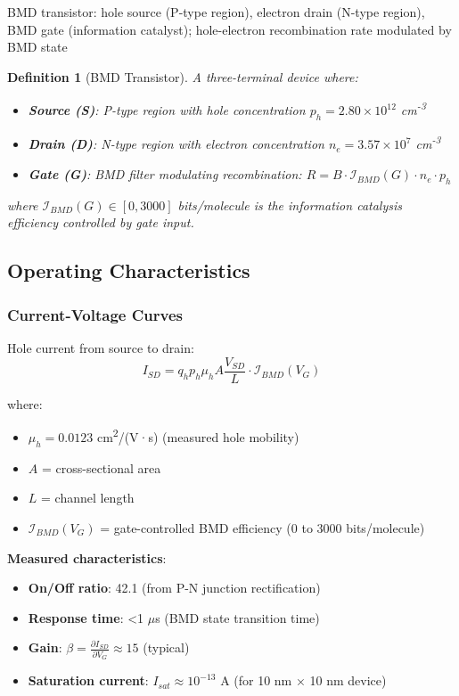 \documentclass[11pt,a4paper]{article}
\newtheorem{definition}{Definition}[section]
\begin{document}
BMD transistor: hole source (P-type region), electron drain (N-type region), BMD gate (information catalyst); hole-electron recombination rate modulated by BMD state

\begin{definition}[BMD Transistor]
A three-terminal device where:
\begin{itemize}
\item \textbf{Source (S)}: P-type region with hole concentration $p_h = 2.80\times10^{12}$ cm\textsuperscript{-3}
\item \textbf{Drain (D)}: N-type region with electron concentration $n_e = 3.57\times10^{7}$ cm\textsuperscript{-3}
\item \textbf{Gate (G)}: BMD filter modulating recombination: $R = B \cdot \mathcal{I}_{BMD}(G) \cdot n_e \cdot p_h$
\end{itemize}
where $\mathcal{I}_{BMD}(G) \in [0, 3000]$ bits/molecule is the information catalysis efficiency controlled by gate input.
\end{definition}

\subsection{Operating Characteristics}

\subsubsection{Current-Voltage Curves}

Hole current from source to drain:
\begin{equation}
I_{SD} = q_h p_h \mu_h A \frac{V_{SD}}{L} \cdot \mathcal{I}_{BMD}(V_G)
\end{equation}

where:
\begin{itemize}
\item $\mu_h = 0.0123$ cm\textsuperscript{2}/(V·s) (measured hole mobility)
\item $A$ = cross-sectional area
\item $L$ = channel length
\item $\mathcal{I}_{BMD}(V_G)$ = gate-controlled BMD efficiency (0 to 3000 bits/molecule)
\end{itemize}

\textbf{Measured characteristics}:
\begin{itemize}
\item \textbf{On/Off ratio}: 42.1 (from P-N junction rectification)
\item \textbf{Response time}: <1 $\mu$s (BMD state transition time)
\item \textbf{Gain}: $\beta = \frac{\partial I_{SD}}{\partial V_G} \approx 15$ (typical)
\item \textbf{Saturation current}: $I_{sat} \approx 10^{-13}$ A (for 10 nm × 10 nm device)
\end{itemize}
\end{document}
